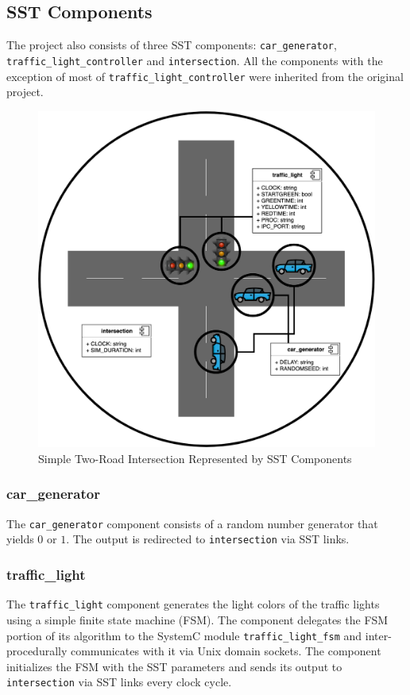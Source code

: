 \documentclass{article}
\begin{document}
    \subsection{SST Components}
    The project also consists of three SST components: \lstinline{car_generator},
    \lstinline{traffic_light_controller} and \lstinline{intersection}. All the components with the
    exception of most of \lstinline{traffic_light_controller} were inherited from the original
    project.

      \begin{figure}[!h]
        \centering
        \includegraphics[width=4.5in]{diagrams/intersection_comp.png}
        \caption{Simple Two-Road Intersection Represented by SST Components}
        \label{fig:intersection_comp}
      \end{figure}

      \subsubsection{car\_generator}
      The \lstinline{car_generator} component consists of a random number generator that yields $0$
      or $1$. The output is redirected to \lstinline{intersection} via SST links.

      \subsubsection{traffic\_light}
      The \lstinline{traffic_light} component generates the light colors of the traffic lights using
      a simple finite state machine (FSM). The component delegates the FSM portion of its algorithm
      to the SystemC module \lstinline{traffic_light_fsm} and inter-procedurally communicates with
      it via Unix domain sockets. The component initializes the FSM with the SST parameters and
      sends its output to \lstinline{intersection} via SST links every clock cycle.
\end{document}
